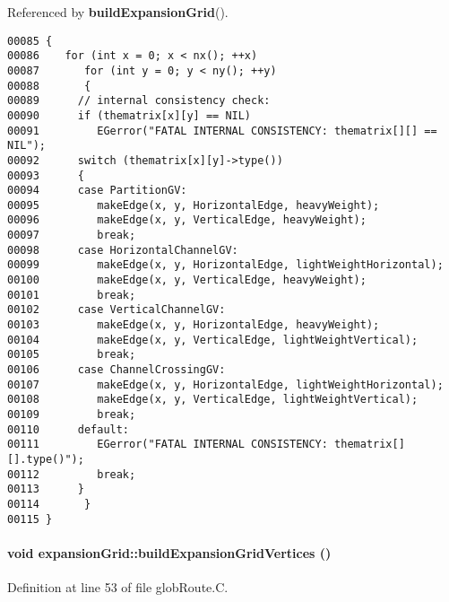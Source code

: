 Referenced by {\bf build\-Expansion\-Grid}().\small\begin{verbatim}00085 {
00086    for (int x = 0; x < nx(); ++x)
00087       for (int y = 0; y < ny(); ++y)
00088       {
00089      // internal consistency check:
00090      if (thematrix[x][y] == NIL)
00091         EGerror("FATAL INTERNAL CONSISTENCY: thematrix[][] == NIL");
00092      switch (thematrix[x][y]->type())
00093      {
00094      case PartitionGV:
00095         makeEdge(x, y, HorizontalEdge, heavyWeight);
00096         makeEdge(x, y, VerticalEdge, heavyWeight);
00097         break;
00098      case HorizontalChannelGV:
00099         makeEdge(x, y, HorizontalEdge, lightWeightHorizontal);
00100         makeEdge(x, y, VerticalEdge, heavyWeight);
00101         break;
00102      case VerticalChannelGV:
00103         makeEdge(x, y, HorizontalEdge, heavyWeight);
00104         makeEdge(x, y, VerticalEdge, lightWeightVertical);
00105         break;
00106      case ChannelCrossingGV:
00107         makeEdge(x, y, HorizontalEdge, lightWeightHorizontal);
00108         makeEdge(x, y, VerticalEdge, lightWeightVertical);
00109         break;
00110      default:
00111         EGerror("FATAL INTERNAL CONSISTENCY: thematrix[][].type()");
00112         break;
00113      }
00114       }
00115 }
\end{verbatim}\normalsize 
\label{expansionGrid_c1}
\paragraph{\setlength{\rightskip}{0pt plus 5cm}void expansion\-Grid::build\-Expansion\-Grid\-Vertices ()\hspace{0.3cm}{\tt  [private]}}\hfill



Definition at line 53 of file glob\-Route.C.

